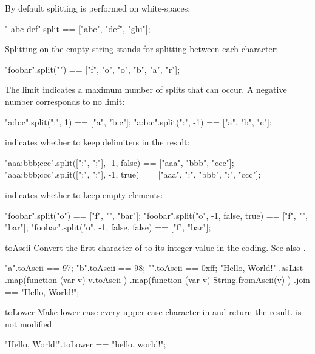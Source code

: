 \begin{urbiscriptapi}
\noindent
By default splitting is performed on white-spaces:

\begin{urbiassert}
"  abc  def\tghi\n".split == ["abc", "def", "ghi"];
\end{urbiassert}

\noindent
Splitting on the empty string stands for splitting between each character:

\begin{urbiassert}
"foobar".split("") == ["f", "o", "o", "b", "a", "r"];
\end{urbiassert}

The limit  indicates a maximum number of splits that can occur. A
negative number corresponds to no limit:

\begin{urbiassert}
"a:b:c".split(":",  1) == ["a", "b:c"];
"a:b:c".split(":", -1) == ["a", "b", "c"];
\end{urbiassert}

 indicates whether to keep delimiters in the result:

\begin{urbiassert}
"aaa:bbb;ccc".split([":", ";"], -1, false) == ["aaa",      "bbb",      "ccc"];
"aaa:bbb;ccc".split([":", ";"], -1, true)  == ["aaa", ":", "bbb", ";", "ccc"];
\end{urbiassert}

 indicates whether to keep empty elements:

\begin{urbiassert}
"foobar".split("o")                   == ["f", "", "bar"];
"foobar".split("o", -1, false, true)  == ["f", "", "bar"];
"foobar".split("o", -1, false, false) == ["f",     "bar"];
\end{urbiassert}


\item[toAscii] Convert the first character of \this to its integer value in
  the  coding.  See also .
\begin{urbiassert}
   "a".toAscii == 97;
   "b".toAscii == 98;
"\xff".toAscii == 0xff;
"Hello, World!\n"
  .asList
  .map(function (var v) { v.toAscii })
  .map(function (var v) { String.fromAscii(v) })
  .join
  == "Hello, World!\n";
\end{urbiassert}

\item[toLower]
  Make lower case every upper case character in \this and
  return the result.  \this is not modified.
\begin{urbiassert}
"Hello, World!".toLower == "hello, world!";
\end{urbiassert}


\end{urbiscriptapi}
